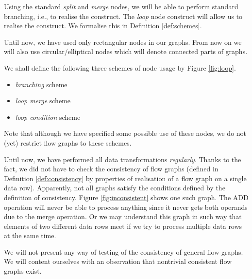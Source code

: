 Using the standard \emph{split} and \emph{merge} nodes, we will be able to perform standard branching, i.e., to realise the  construct. The \emph{loop} node construct will allow us to realise the  construct. We formalise this in Definition \ref{def:schemes}.

\begin{rem}
  Until now, we have used only rectangular nodes in our graphs. From now on we will also use circular/elliptical nodes which will denote connected parts of graphs.
\end{rem}

We shall define the following three schemes of node usage by Figure \ref{fig:loop}.
\begin{itemize}
  \item \emph{branching} scheme
  \item \emph{loop merge} scheme
  \item \emph{loop condition} scheme
\end{itemize}
{}
\myenddef

\begin{rem}
  Note that although we have specified some possible use of these nodes, we do not (yet) restrict flow graphs to these schemes.
\end{rem}

Until now, we have performed all data transformations \emph{regularly}. Thanks to the fact, we did not have to check the consistency of flow graphs (defined in Definition \ref{def:consistency} by properties of realisation of a flow graph on a single data row).  Apparently, not all graphs satisfy the conditions defined by the definition of consistency. Figure \ref{fig:inconsistent} shows one such graph. The ADD operation will never be able to process anything since it never gets both operands due to the merge operation. Or we may understand this graph in such way that elements of two different data rows meet if we try to process multiple data rows at the same time.


We will not present any way of testing of the consistency of general flow graphs. We will content ourselves with an observation that nontrivial consistent flow graphs exist.

